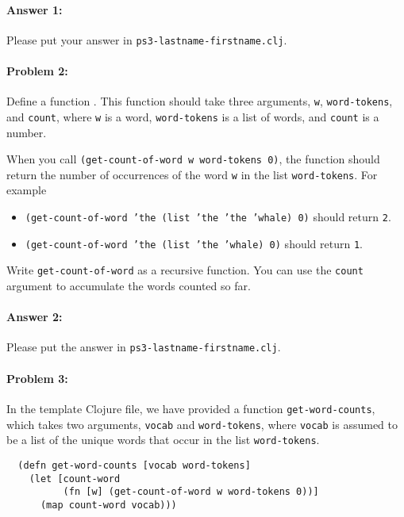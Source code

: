 \documentclass[10pt]{article}
\newcommand{\required}[1]{{\color{blue}{#1}}}
\newcommand{\PSnum}{3}
\begin{document}
\paragraph{Answer 1:} Please put your answer in
\texttt{ps\PSnum-lastname-firstname.clj}.

\hrulefill %

\paragraph{Problem 2:}

Define a function \required{\texttt{get-count-of-word}}. This function should
take three arguments, \texttt{w}, \texttt{word-tokens}, and \texttt{count},
where \texttt{w} is a word, \texttt{word-tokens} is a list of words, and
\texttt{count} is a number.


When you call \texttt{(get-count-of-word w word-tokens 0)},  the function should
return the number of occurrences of the word \texttt{w} in the list
\texttt{word-tokens}. For example
\begin{itemize}[noitemsep]
  \item \texttt{(get-count-of-word 'the (list 'the 'the 'whale) 0)} should
    return \texttt{2}.
  \item \texttt{(get-count-of-word 'the (list 'the 'whale) 0)} should return
    \texttt{1}.
\end{itemize}
Write \texttt{get-count-of-word} as a recursive function.   You can use the
\texttt{count} argument to accumulate the words counted so far.

\paragraph{Answer 2:} Please put the answer in
\texttt{ps\PSnum-lastname-firstname.clj}.

\hrulefill %

\paragraph{Problem 3:}

In the template Clojure file, we have provided a function
\texttt{get-word-counts}, which takes two arguments, \texttt{vocab} and
\texttt{word-tokens}, where \texttt{vocab} is assumed to be a list of the unique
words that occur in the list \texttt{word-tokens}.
\begin{lstlisting}
  (defn get-word-counts [vocab word-tokens]
    (let [count-word
          (fn [w] (get-count-of-word w word-tokens 0))]
      (map count-word vocab)))
\end{lstlisting}
\end{document}
